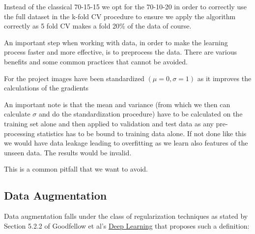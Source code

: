Instead of the classical 70-15-15 we opt for the 70-10-20 in order to correctly use the full dataset in the
k-fold CV procedure to ensure we apply the algorithm correctly as 5 fold CV makes a fold 20\% of the data of course.

An important step when working with data, in order to make the learning process faster and more effective, is to
preprocess the data. There are various benefits and some common practices that cannot be avoided.

For the project images have been standardized $(\mu=0, \sigma=1)$ as it improves the calculations of the
gradients

An important note is that the mean and variance (from which we then can calculate $\sigma$ and do
the standardization procedure) have to be calculated on the training set alone and then applied to
validation and test data as any pre-processing statistics has to be bound to training data alone.
If not done like this we would have data leakage leading to overfitting as we learn also features of the unseen data.
The results would be invalid.

This is a common pitfall that we want to avoid.

\subsection{Data Augmentation}
Data augmentation falls under the class of regularization techniques as stated by Section 5.2.2 of Goodfellow et al's
\href{http://www.deeplearningbook.org/contents/ml.html}{Deep Learning} that proposes such a definition:

